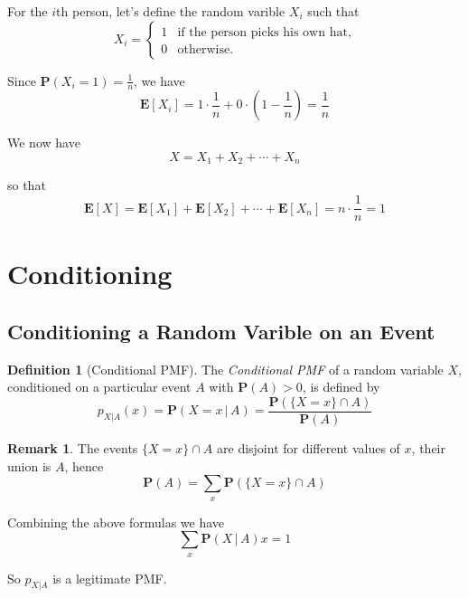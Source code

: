 \documentclass{tufte-handout}
\theoremstyle{definition} \newtheorem{definition}{Definition}
\theoremstyle{definition} \newtheorem{remark}{Remark}
\newcommand{\prob}[1]{\mathbf{P} \left( #1 \right)}
\newcommand{\cprob}[2]{\mathbf{P} \left( #1 \, | \, #2 \right)}
\newcommand{\expt}[1]{\mathbf{E} \left[ #1 \right]}
\newcommand{\cpmf}[3]{p_{#1 | #2} \left( #3 \right)}
\begin{document}
\begin{solution}
  For the $i$th person, let's define the random varible $X_i$ such that
  \begin{equation*}
    X_i =
    \begin{cases}
      1 & \text{if the person picks his own hat},\\
      0 & \text{otherwise}.
    \end{cases}
  \end{equation*}

  Since $\prob{X_i = 1} = \frac{1}{n}$, we have
  \begin{equation*}
    \expt{X_i} = 1 \cdot \frac{1}{n} + 0 \cdot (1 - \frac{1}{n})
    = \frac{1}{n}
  \end{equation*}

  We now have
  \begin{equation*}
    X = X_1 + X_2 + \cdots + X_n
  \end{equation*}

  so that
  \begin{equation*}
    \expt{X} = \expt{X_1} + \expt{X_2} + \cdots + \expt{X_n}
    = n \cdot \frac{1}{n} = 1
  \end{equation*}
\end{solution}

\section{Conditioning}

\subsection{Conditioning a Random Varible on an Event}

\begin{definition}[Conditional PMF]
  The \emph{Conditional PMF} of a random variable $X$, conditioned on a
  particular event $A$ with $\prob{A} > 0$, is defined by
  \begin{equation*}
    \cpmf{X}{A}{x} = \cprob{X = x}{A}
    = \frac{ \prob{\{X = x \} \cap A}}{\prob{A}}
  \end{equation*}
\end{definition}

\begin{remark}
  The events $\{X = x\} \cap A$ are disjoint for different values of $x$,
  their union is $A$, hence
  \begin{equation*}
    \prob{A} = \sum_x \prob{\{X = x\} \cap A}
  \end{equation*}

  Combining the above formulas we have
  \begin{equation*}
    \sum_x \cprob{X}{A}{x} = 1
  \end{equation*}

  So $p_{X|A}$ is a legitimate PMF.
\end{remark}
\end{document}

